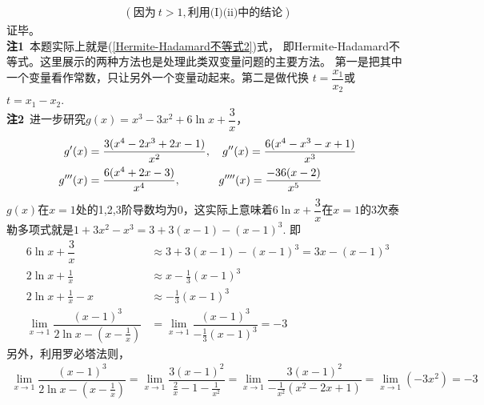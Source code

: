 \begin{enumerate}[label={【\textbf{例\thechapter.\arabic*}】},
 leftmargin=\inteval{\myenumleftmargin}pt,
 itemsep=\inteval{\myenumitempsep}pt,
 itemindent=\inteval{\myenumitemindent}pt]
\begin{align*}
    (\text{因为}\ t>1, \text{利用(I)(ii)中的结论}) 
\end{align*}
证毕。\\
\textbf{注1}\ 本题实际上就是(\ref{Hermite-Hadamard不等式2})式，
即Hermite-Hadamard不等式。这里展示的两种方法也是处理此类双变量问题的主要方法。
第一是把其中一个变量看作常数，只让另外一个变量动起来。第二是做代换
$ t=\dfrac{x_1}{x_2} $或$ t=x_1-x_2 $.\\
\textbf{注2}\ 进一步研究$ g(x)=x^3-3x^2+6\ln x+\dfrac{3}{x} $，
\begin{align*}
    g'(x) &=\dfrac{3(x^4-2x^3+2x-1)}{x^2},\quad 
    g''(x) =\frac{6(x^4-x^3-x+1)}{x^3} \\
    g'''(x) &=\frac{6(x^4+2x-3)}{x^4},\hspace{1.2cm} 
    g''''(x) =\frac{-36(x-2)}{x^5} 
\end{align*}
$ g(x) $在$ x=1 $处的1,2,3阶导数均为0，这实际上意味着$ 6\ln x+
\dfrac{3}{x} $在$ x=1 $的3次泰勒多项式就是$ 1+3x^2-x^3=3+3(x-1)
-(x-1)^3 $. 即
\begin{align*}
    6\ln x+\dfrac{3}{x} &\approx 3+3(x-1)-(x-1)^3=3x-(x-1)^3 \\
    2\ln x+\frac{1}{x} & \approx x-\frac{1}{3}(x-1)^3 \\
    2\ln x+\frac{1}{x} -x & \approx -\frac{1}{3}(x-1)^3 \\
    \lim_{x\to 1}\dfrac{(x-1)^3}{2\ln x-\left(x-\frac{1}{x}
        \right)} &=\lim_{x\to 1}\dfrac{(x-1)^3}{-\frac{1}{3}(x-1)^3}=-3
\end{align*}
另外，利用罗必塔法则，
\begin{gather*}
    \lim_{x\to 1}\dfrac{(x-1)^3}{2\ln x-\left(x-\frac{1}{x}\right)}=
    \lim_{x\to 1}\dfrac{3(x-1)^2}{\frac{2}{x}-1-\frac{1}{x^2}}=
    \lim_{x\to 1}\dfrac{3(x-1)^2}{-\frac{1}{x^2}\left(x^2-2x+1\right)}=
    \lim_{x\to 1}(-3x^2)=-3
\end{gather*}


\end{enumerate}
